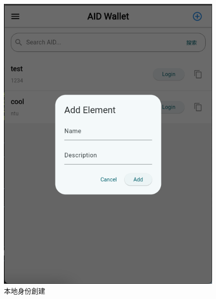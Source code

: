 \begin{figure}[p]
  \centering
  \includegraphics[width=\linewidth]{figures/wallet-create-demo.png}
  \caption{本地身份創建}
  \label{fig:appendix-wallet-create-demo}
\end{figure}
\clearpage
